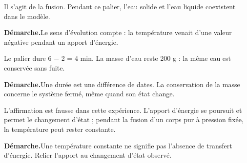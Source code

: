 \label{cor-ann-14}
\par\noindent\begin{minipage}{\linewidth}Il s’agit de la fusion. Pendant ce palier, l’eau solide et l’eau liquide coexistent dans le modèle.\par\smallskip\textbf{Démarche.}\enspace Le sens d’évolution compte : la température venait d’une valeur négative pendant un apport d’énergie.\par{}\end{minipage}\par
\par\noindent\begin{minipage}{\linewidth}Le palier dure 6 − 2 = 4 min. La masse d’eau reste 200 g : la même eau est conservée sans fuite.\par\smallskip\textbf{Démarche.}\enspace Une durée est une différence de dates. La conservation de la masse concerne le système fermé, même quand son état change.\par{}\end{minipage}\par
\par\noindent\begin{minipage}{\linewidth}L’affirmation est fausse dans cette expérience. L’apport d’énergie se poursuit et permet le changement d’état ; pendant la fusion d’un corps pur à pression fixée, la température peut rester constante.\par\smallskip\textbf{Démarche.}\enspace Une température constante ne signifie pas l’absence de transfert d’énergie. Relier l’apport au changement d’état observé.\par{}\end{minipage}\par
{}
